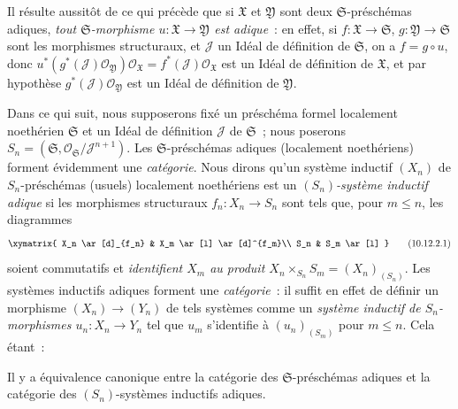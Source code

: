 Il résulte aussitôt de ce qui précède que si $\mathfrak{X}$ et
$\mathfrak{Y}$ sont deux $\mathfrak{S}$-préschémas adiques, \emph{tout
$\mathfrak{S}$-morphisme $u:\mathfrak{X}\to\mathfrak{Y}$ est adique}~:
en effet, si $f:\mathfrak{X}\to\mathfrak{S}$,
$g:\mathfrak{Y}\to\mathfrak{S}$ sont les morphismes structuraux, et
$\mathscr{J}$ un Idéal de définition de $\mathfrak{S}$, on a
$f=g\circ u$, donc
$u^*(g^*(\mathscr{J})\mathscr{O}_{\mathfrak{Y}})
\mathscr{O}_{\mathfrak{X}}=f^*(\mathscr{J})
\mathscr{O}_{\mathfrak{X}}$ est un Idéal de définition de
$\mathfrak{X}$, et par hypothèse
$g^*(\mathscr{J})\mathscr{O}_{\mathfrak{Y}}$ est un Idéal de définition
de $\mathfrak{Y}$.

\begin{env}[10.12.2]
\label{I.10.12.2-fr}
Dans ce qui suit, nous supposerons fixé un préschéma formel localement
noethérien $\mathfrak{S}$ et un Idéal de définition $\mathscr{J}$ de
$\mathfrak{S}$~; nous poserons
$S_n=(\mathfrak{S},\mathscr{O}_{\mathfrak{S}}/\mathscr{J}^{n+1})$. Les
$\mathfrak{S}$-préschémas adiques (localement noethériens) forment
évidemment une \emph{catégorie}. Nous dirons qu'un système inductif
$(X_n)$ de $S_n$-préschémas (usuels) localement noethériens est un
\emph{$(S_n)$-système inductif adique} si les morphismes structuraux
$f_n:X_n\to S_n$ sont tels que, pour $m\leq n$, les diagrammes
\[
  \label{I.10.12.2.1-fr}
  \xymatrix{
    X_n \ar[d]_{f_n}
    & X_m \ar[l] \ar[d]^{f_m}\\
    S_n
    & S_m \ar[l]
  }
  \tag{10.12.2.1}
\]
soient commutatifs et \emph{identifient $X_m$ au produit
$X_n\times_{S_n}S_m=(X_n)_{(S_n)}$}. Les systèmes inductifs adiques
forment une \emph{catégorie}~: il suffit en effet de définir un morphisme
$(X_n)\to(Y_n)$ de tels systèmes comme un \emph{système inductif de
$S_n$-morphismes $u_n:X_n\to Y_n$} tel que $u_m$ s'identifie à
$(u_n)_{(S_m)}$ pour $m\leq n$. Cela étant~:
\end{env}

\begin{theorem}[10.12.3]
\label{I.10.12.3-fr}
Il y a équivalence canonique entre la catégorie des
$\mathfrak{S}$-préschémas adiques et la catégorie des
$(S_n)$-systèmes inductifs adiques.
\end{theorem}

